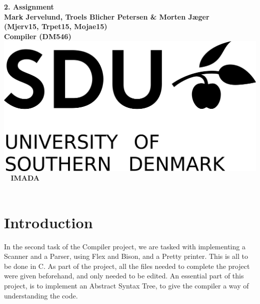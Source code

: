 \documentclass[a4paper,10pt,titlepage]{report}
\begin{document}
\begin{titlepage}
\centering
    \vspace*{9\baselineskip}
    \huge
    \bfseries
    2. Assignment \\
    \normalfont 
    Mark Jervelund, Troels Blicher Petersen \& Morten Jæger  \\
    (Mjerv15, Trpet15, Mojae15) \\
	\huge    
    Compiler (DM546)  \\[4\baselineskip]
    \normalfont
	\includegraphics[scale=1]{SDU_logo}
    \vfill\ 
    \vspace{5mm}
    IMADA \\

    \textbf{\datedate} \\[2\baselineskip]
\end{titlepage}

\renewcommand{\thepage}{\roman{page}}%
\tableofcontents
\newpage
\setcounter{page}{1}
\renewcommand{\thepage}{\arabic{page}}
\newpage

\section{Introduction}
In the second task of the Compiler project, we are tasked with implementing a Scanner and a Parser, using Flex and Bison, and a Pretty printer. This is all to be done in C. As part of the project, all the files needed to complete the project were given beforehand, and only needed to be edited. An essential part of this project, is to implement an Abstract Syntax Tree, to give the compiler a way of understanding the code.
\end{document}
